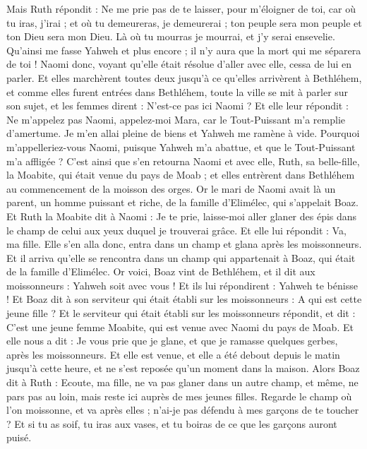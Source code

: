 \begin{multicols}{2}
Mais Ruth répondit : Ne me prie pas de te laisser, pour m'éloigner de toi, car où tu iras, j'irai ; et où tu demeureras, je demeurerai ; ton peuple sera mon peuple et ton Dieu sera mon Dieu.
Là où tu mourras je mourrai, et j'y serai ensevelie. Qu'ainsi me fasse Yahweh et plus encore ; il n'y aura que la mort qui me séparera de toi !
Naomi donc, voyant qu'elle était résolue d'aller avec elle, cessa de lui en parler.
Et elles marchèrent toutes deux jusqu'à ce qu'elles arrivèrent à Bethléhem, et comme elles furent entrées dans Bethléhem, toute la ville se mit à parler sur son sujet, et les femmes dirent : N'est-ce pas ici Naomi ?
Et elle leur répondit : Ne m'appelez pas Naomi, appelez-moi Mara, car le Tout-Puissant m'a remplie d'amertume.
Je m'en allai pleine de biens et Yahweh me ramène à vide. Pourquoi m'appelleriez-vous Naomi, puisque Yahweh m'a abattue, et que le Tout-Puissant m'a affligée ?
C'est ainsi que s'en retourna Naomi et avec elle, Ruth, sa belle-fille, la Moabite, qui était venue du pays de Moab ; et elles entrèrent dans Bethléhem au commencement de la moisson des orges.
\VerseOne{}Or le mari de Naomi avait là un parent, un homme puissant et riche, de la famille d'Elimélec, qui s'appelait Boaz.
Et Ruth la Moabite dit à Naomi : Je te prie, laisse-moi aller glaner des épis dans le champ de celui aux yeux duquel je trouverai grâce. Et elle lui répondit : Va, ma fille.
Elle s'en alla donc, entra dans un champ et glana après les moissonneurs. Et il arriva qu'elle se rencontra dans un champ qui appartenait à Boaz, qui était de la famille d'Elimélec.
Or voici, Boaz vint de Bethléhem, et il dit aux moissonneurs : Yahweh soit avec vous ! Et ils lui répondirent : Yahweh te bénisse !
Et Boaz dit à son serviteur qui était établi sur les moissonneurs : A qui est cette jeune fille ?
Et le serviteur qui était établi sur les moissonneurs répondit, et dit : C'est une jeune femme Moabite, qui est venue avec Naomi du pays de Moab.
Et elle nous a dit : Je vous prie que je glane, et que je ramasse quelques gerbes, après les moissonneurs. Et elle est venue, et elle a été debout depuis le matin jusqu'à cette heure, et ne s'est reposée qu'un moment dans la maison.
Alors Boaz dit à Ruth : Ecoute, ma fille, ne va pas glaner dans un autre champ, et même, ne pars pas au loin, mais reste ici auprès de mes jeunes filles.
Regarde le champ où l'on moissonne, et va après elles ; n'ai-je pas défendu à mes garçons de te toucher ? Et si tu as soif, tu iras aux vases, et tu boiras de ce que les garçons auront puisé.

\end{multicols}
